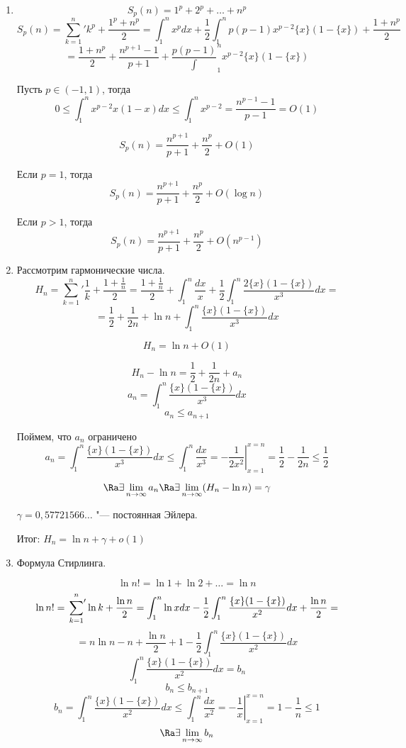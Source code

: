 ﻿\begin{exmp}
\begin{enumerate}
\item 
$$S_p(n) = 1^p + 2^p + \ldots + n^p$$
$$S_p(n) = {\sum_{k = 1}^{n}}' k^p + \frac{1^p + n^p}{2} = 
\int_1^n x^p dx + \frac{1}{2}\int_1^n p(p - 1)x^{p - 2}\{x\}(1 - \{x\}) + \frac{1 + n^p}{2}$$
$$= \frac{1 + n^p}{2} + \frac{n^{p + 1} - 1}{p + 1} + \frac{p(p - 1)}\int_1^n x^{p - 2}\{x\}(1 - \{x\})$$

Пусть $p \in (-1, 1)$, тогда
$$0 \le \int_1^n x^{p - 2}{x}(1 - {x})dx \le \int_1^{n}x^{p - 2} = 
\frac{n^{p - 1} - 1}{p - 1} = O(1)$$

$$S_p(n) = \frac{n^{p + 1}}{p + 1} + \frac{n^p}{2} + O(1)$$


Если $p = 1$, тогда
$$S_p(n) = \frac{n^{p + 1}}{p + 1} + \frac{n^p}{2} + O(\log n)$$

Если $p > 1$, тогда
$$S_p(n) = \frac{n^{p + 1}}{p + 1} + \frac{n^p}{2} + O(n^{p - 1})$$

\item
Рассмотрим гармонические числа.
$$H_n = {\sum_{k = 1}^n}' \frac{1}{k} + \frac{1 + \frac{1}{n}}{2} =
\frac{1 + \frac{1}{n}}{2} + \int_1^{n}\frac{dx}{x} + \frac{1}{2}\int_1^n\frac{2\{x\}(1 - \{x\})}{x^3}dx =$$
$$= \frac{1}{2} + \frac{1}{2n} + \ln n + \int_1^n\frac{\{x\}(1 - \{x\})}{x^3}dx$$

$$H_n = \ln n + O(1)$$

$$H_n - \ln n = \frac{1}{2} + \frac{1}{2n} + a_n$$
$$a_n = \int_1^n\frac{\{x\}(1 - \{x\})}{x^3}dx$$
$$a_n \le a_{n + 1}$$

Поймем, что $a_n$ ограничено
$$a_n = \int_1^n\frac{\{x\}(1 - \{x\})}{x^3}dx \le 
\int_1^{n}\frac{dx}{x^3} = \left. -\frac{1}{2x^2}\right |_{x = 1}^{x = n} = 
\frac{1}{2} - \frac{1}{2n} \le \frac{1}{2}$$

$$\Ra \exists \lim_{n \to \infty} a_n \Ra \exists \lim_{n \to \infty}(H_n - \ln n) = \gamma$$ 

$\gamma = 0,57721566\ldots$ "--- постоянная Эйлера.

Итог: $H_n = \ln n + \gamma + o(1)$
\item Формула Стирлинга.

$$\ln n! = \ln 1 + \ln 2 + \ldots = \ln n$$
$$\ln n! = \sideset{}{'}\sum_{k = 1}^{n} \ln k + \frac{\ln n}{2} =
\int_{1}^{n}\ln xdx - \frac{1}{2}\int_{1}^{n}\frac{\{x\}(1 - \{x\})}{x^2}dx + \frac{\ln n}{2} =$$
$$= n\ln n - n + \frac{\ln n}{2} + 1 - \frac{1}{2}\int_{1}^{n}\frac{\{x\}(1 - \{x\})}{x^2}dx $$
$$\int_{1}^{n}\frac{\{x\}(1 - \{x\})}{x^2}dx = b_n$$
$$b_n \le b_{n + 1}$$
$$b_n = \int_{1}^{n}\frac{\{x\}(1 - \{x\})}{x^2}dx  \le \int_1^{n}\frac{dx}{x^2} = \left. -\frac{1}{x} \right|_{x = 1}^{x = n} = 1 -\frac{1}{n} \le 1$$
$$\Ra \exists \lim_{n \to \infty} b_n$$


\end{enumerate}
\end{exmp}
